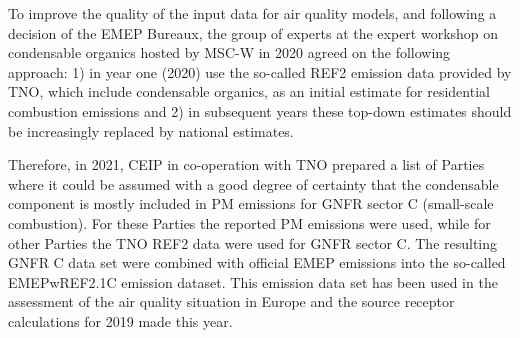 To improve the quality of the input data for air quality models, and following a decision of the EMEP Bureaux, the group of experts at the expert workshop on condensable organics hosted by MSC-W in 2020 agreed on the following approach: 1) in year one (2020) use the so-called REF2 emission data provided by TNO, which include condensable organics, as an initial estimate for residential combustion emissions and 2) in subsequent years these top-down estimates should be increasingly replaced by national estimates. 

Therefore, in 2021, CEIP in co-operation with TNO prepared a list of Parties where it could be assumed with a good degree of certainty that the condensable component is mostly included in PM emissions for GNFR sector C (small-scale combustion). For these Parties the reported PM emissions were used, while for other Parties the TNO REF2 data were used for GNFR sector C. The resulting GNFR C data set were combined with official EMEP emissions into the so-called EMEPwREF2.1C emission dataset. This emission data set has been used in the assessment of the air quality situation in Europe and the source receptor calculations for 2019 made this year. 



